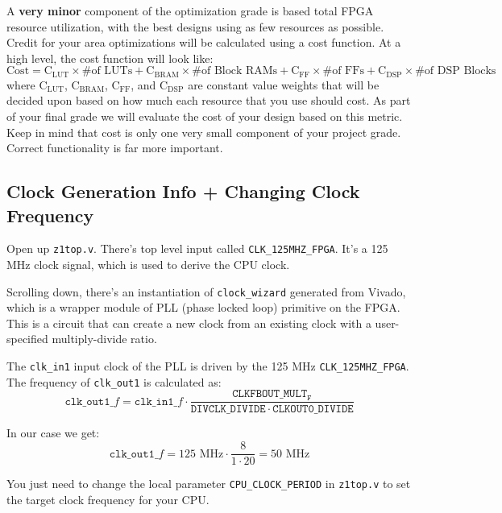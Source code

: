 \documentclass[11pt]{article}
\begin{document}
A \textbf{very minor} component of the optimization grade is based total FPGA resource utilization, with the best designs using as few resources as possible.
Credit for your area optimizations will be calculated using a cost function.
At a high level, the cost function will look like:
\begin{equation*}
\mathrm{Cost}=\mathrm{C_{LUT}} \times \text{\# of LUTs} + \mathrm{C_{BRAM}} \times \text{\# of Block RAMs} + \mathrm{C_{FF}} \times \text{\# of FFs} + \mathrm{C_{DSP}} \times \text{\# of DSP Blocks}
\end{equation*}
where $\mathrm{C_{LUT}}$, $\mathrm{C_{BRAM}}$, $\mathrm{C_{FF}}$, and $\mathrm{C_{DSP}}$ are constant value weights that will be decided upon based on how much each resource that you use should cost. As part of your final grade we will evaluate the cost of your design based on this metric. Keep in mind that cost is only one very small component of your project grade. Correct functionality is far more important.

\subsection{Clock Generation Info + Changing Clock Frequency}
Open up \verb|z1top.v|.
There's top level input called \verb|CLK_125MHZ_FPGA|.
It's a 125 MHz clock signal, which is used to derive the CPU clock.

Scrolling down, there's an instantiation of \verb|clock_wizard| generated from Vivado, which is a wrapper module of PLL (phase locked loop) primitive on the FPGA.
This is a circuit that can create a new clock from an existing clock with a user-specified multiply-divide ratio.

The \verb|clk_in1| input clock of the PLL is driven by the 125 MHz \verb|CLK_125MHZ_FPGA|.
The frequency of \verb|clk_out1| is calculated as:
\begin{equation*}
  \mathtt{clk\_out1}\_f = \mathtt{clk\_in1}\_f \cdot \frac{\mathtt{CLKFBOUT\_MULT_F}}{\mathtt{DIVCLK\_DIVIDE} \cdot \mathtt{CLKOUT0\_DIVIDE}}
\end{equation*}

In our case we get:
\begin{equation*}
  \mathtt{clk\_out1}\_f = 125 \text{ MHz} \cdot \frac{8}{1 \cdot 20} = 50 \text{ MHz}
\end{equation*}

You just need to change the local parameter \verb|CPU_CLOCK_PERIOD| in \verb|z1top.v| to set the target clock frequency for your CPU.
\end{document}
